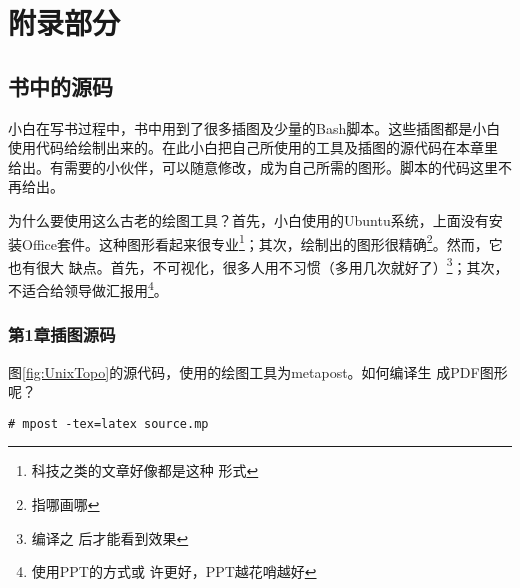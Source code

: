 \part{附录部分}
\chapter{书中的源码}
\label{chap:sourceCode}

小白在写书过程中，书中用到了很多插图及少量的Bash脚本。这些插图都是小白
使用代码给绘制出来的。在此小白把自己所使用的工具及插图的源代码在本章里
给出。有需要的小伙伴，可以随意修改，成为自己所需的图形。脚本的代码这里不
再给出。

为什么要使用这么古老的绘图工具？首先，小白使用的Ubuntu系统，上面没有安
装Office套件。这种图形看起来很专业\footnote{科技之类的文章好像都是这种
  形式}；其次，绘制出的图形很精确\footnote{指哪画哪}。然而，它也有很大
缺点。首先，不可视化，很多人用不习惯（多用几次就好了）\footnote{编译之
  后才能看到效果}；其次，不适合给领导做汇报用\footnote{使用PPT的方式或
  许更好，PPT越花哨越好}。

\section{第1章插图源码}

图\ref{fig:UnixTopo}的源代码，使用的绘图工具为metapost。如何编译生
成PDF图形呢？

\begin{verbatim}
# mpost -tex=latex source.mp
\end{verbatim}

